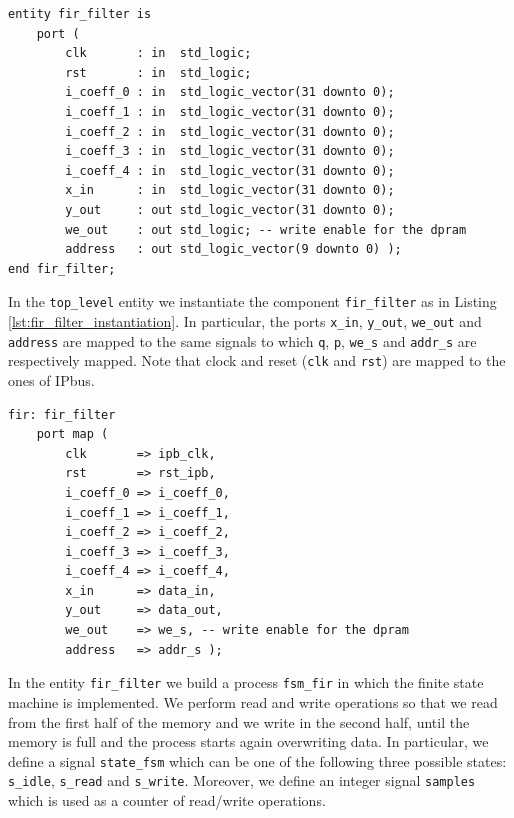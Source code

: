 \documentclass[11pt, a4paper]{article}
\begin{document}
\begin{lstlisting}[style=vhdl,label={lst:fir_filter},caption={{\footnotesize\texttt{fir\_filter}} entity.}]
entity fir_filter is
	port (
		clk       : in  std_logic;
		rst       : in  std_logic;
		i_coeff_0 : in  std_logic_vector(31 downto 0);
		i_coeff_1 : in  std_logic_vector(31 downto 0);
		i_coeff_2 : in  std_logic_vector(31 downto 0);
		i_coeff_3 : in  std_logic_vector(31 downto 0);
		i_coeff_4 : in  std_logic_vector(31 downto 0);
		x_in      : in  std_logic_vector(31 downto 0);
		y_out     : out std_logic_vector(31 downto 0);
		we_out    : out std_logic; -- write enable for the dpram
		address   : out std_logic_vector(9 downto 0) );
end fir_filter;
\end{lstlisting}

In the {\footnotesize\texttt{top\_level}} entity we instantiate the component {\footnotesize\texttt{fir\_filter}} as in Listing \ref{lst:fir_filter_instantiation}. In particular, the ports {\footnotesize\texttt{x\_in}}, {\footnotesize\texttt{y\_out}}, {\footnotesize\texttt{we\_out}} and {\footnotesize\texttt{address}} are mapped to the same signals to which {\footnotesize\texttt{q}}, {\footnotesize\texttt{p}}, {\footnotesize\texttt{we\_s}} and {\footnotesize\texttt{addr\_s}} are respectively mapped. Note that clock and reset ({\footnotesize\texttt{clk}} and {\footnotesize\texttt{rst}}) are mapped to the ones of IPbus. 

\begin{lstlisting}[style=vhdl,label={lst:fir_filter_instantiation},caption={{\footnotesize\texttt{fir\_filter}} instantiation in the {\footnotesize\texttt{top\_level}}.}]
fir: fir_filter
	port map (
		clk       => ipb_clk,
		rst       => rst_ipb,
		i_coeff_0 => i_coeff_0,
		i_coeff_1 => i_coeff_1,
		i_coeff_2 => i_coeff_2,
		i_coeff_3 => i_coeff_3,
		i_coeff_4 => i_coeff_4,
		x_in      => data_in,
		y_out     => data_out,
		we_out    => we_s, -- write enable for the dpram
		address   => addr_s );
\end{lstlisting}

In the entity {\footnotesize\texttt{fir\_filter}} we build a process {\footnotesize\texttt{fsm\_fir}} in which the finite state machine is implemented.
We perform read and write operations so that we read from the first half of the memory and we write in the second half, until the memory is full and the process starts again overwriting data. In particular, we define a signal {\footnotesize\texttt{state\_fsm}} which can be one of the following three possible states: {\footnotesize\texttt{s\_idle}},  {\footnotesize\texttt{s\_read}} and {\footnotesize\texttt{s\_write}}. Moreover, we define an integer signal {\footnotesize\texttt{samples}} which is used as a counter of read/write operations.
\end{document}
